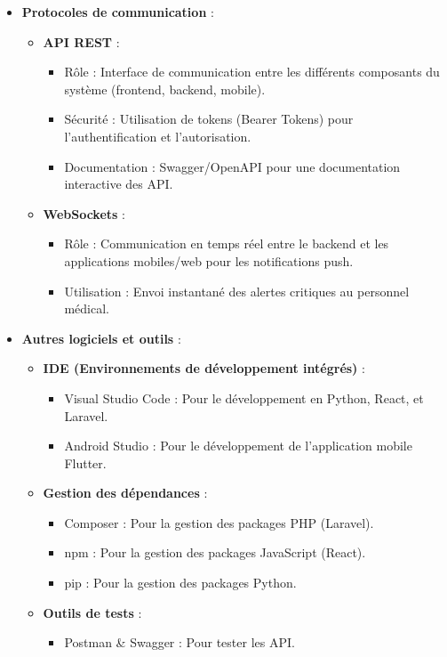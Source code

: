 \begin{itemize}
    \item \textbf{Protocoles de communication} :
    \begin{itemize}
        \item \textbf{API REST} :
            \begin{itemize}
                \item Rôle : Interface de communication entre les différents composants du système (frontend, backend, mobile).
                \item Sécurité : Utilisation de tokens (Bearer Tokens) pour l'authentification et l'autorisation.
                \item Documentation : Swagger/OpenAPI pour une documentation interactive des API.
            \end{itemize}
        \item \textbf{WebSockets} :
            \begin{itemize}
                \item Rôle : Communication en temps réel entre le backend et les applications mobiles/web pour les notifications push.
                \item Utilisation : Envoi instantané des alertes critiques au personnel médical.
            \end{itemize}
    \end{itemize}

    \item \textbf{Autres logiciels et outils} :
    \begin{itemize}
        \item \textbf{IDE (Environnements de développement intégrés)} :
            \begin{itemize}
                \item Visual Studio Code : Pour le développement en Python, React, et Laravel.
                \item Android Studio : Pour le développement de l'application mobile Flutter.
            \end{itemize}
        \item \textbf{Gestion des dépendances} :
            \begin{itemize}
                \item Composer : Pour la gestion des packages PHP (Laravel).
                \item npm : Pour la gestion des packages JavaScript (React).
                \item pip : Pour la gestion des packages Python.
            \end{itemize}
        \item \textbf{Outils de tests} :
            \begin{itemize}
                \item Postman \& Swagger : Pour tester les API.
            \end{itemize}
    \end{itemize}
\end{itemize}